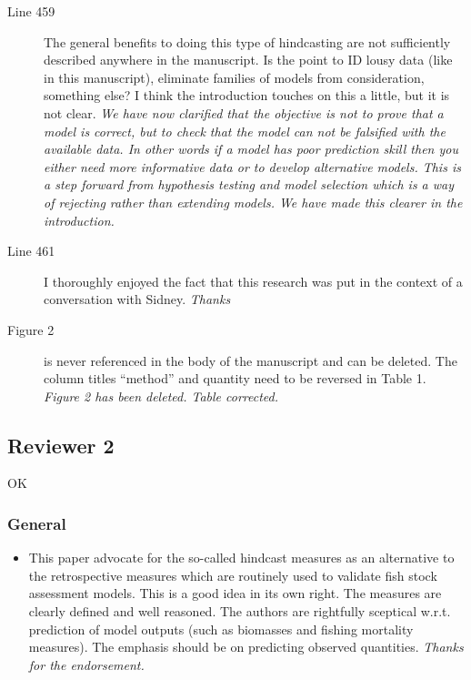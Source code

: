 \begin{itemize}
\begin{description}
\item[Line 459] The general benefits to doing this type of hindcasting are not sufficiently described anywhere in the manuscript. Is the point to ID lousy data (like in this manuscript), eliminate families of models from consideration, something else? I think the introduction touches on this a little, but it is not clear.
\textit{\newline We have now clarified that the objective is not to prove that a model is correct, but to check that the model can not be falsified with the available data. In other words if a model has poor prediction skill then you either need more informative data or to develop alternative models. This is a step forward from hypothesis testing and model selection which is a way of rejecting rather than extending models. We have made this clearer in the introduction.}

\item[Line 461] I thoroughly enjoyed the fact that this research was put in the context of a conversation with Sidney.
\textit{\newline Thanks}

\item[Figure 2] is never referenced in the body of the manuscript and can be deleted. The column titles “method” and quantity need to be reversed in Table 1.
\textit{\newline Figure 2 has been deleted. Table corrected.}

\end{description}

\newpage
\subsection*{Reviewer 2}OK

\subsubsection*{General}

\begin{itemize}
    \item This paper advocate for the so-called hindcast measures as an alternative to the retrospective measures which are routinely used to validate fish stock assessment models. This is a good idea in its own right. The measures are clearly defined and well reasoned. The authors are rightfully sceptical w.r.t. prediction of model outputs (such as biomasses and fishing mortality measures). The emphasis should be on predicting observed quantities.
    \textit{\newline Thanks for the endorsement.}


\end{itemize}
\end{itemize}
